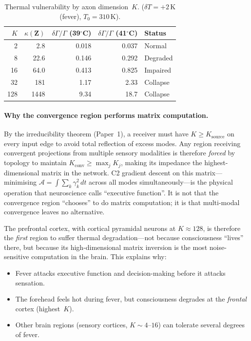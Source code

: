 \documentclass[aps,pre,twocolumn,superscriptaddress,floatfix]{revtex4-2}
\begin{document}
\begin{table}[h]
\centering
\caption{Thermal vulnerability by axon dimension~$K$.
($\delta T=+2$\,K (fever), $T_0=310$\,K).}
\label{tab:thermal-K}
\begin{tabular}{@{}rrrrl@{}}
\toprule
$K$ & $\kappa(\mathbf{Z})$ & $\delta\Gamma/\Gamma$ (39$^\circ$C)
    & $\delta\Gamma/\Gamma$ (41$^\circ$C) & Status \\
\midrule
2   & 2.8    & 0.018  & 0.037  & Normal \\
8   & 22.6   & 0.146  & 0.292  & Degraded \\
16  & 64.0   & 0.413  & 0.825  & Impaired \\
32  & 181    & 1.17   & 2.33   & Collapse \\
128 & 1448   & 9.34   & 18.7   & Collapse \\
\bottomrule
\end{tabular}
\end{table}

\paragraph{Why the convergence region performs matrix computation.}
By the irreducibility theorem (Paper~1),
a receiver must have $K \ge K_{\text{source}}$ on every
input edge to avoid total reflection of excess modes.
Any region receiving convergent projections from
multiple sensory modalities is therefore \emph{forced}
by topology to maintain
$K_{\text{conv}} \ge \max_j K_j$, making its
impedance the highest-dimensional matrix in the network.
C2 gradient descent on this matrix---minimising
$\mathcal{A} = \int\!\sum_k \gamma_k^2\,dt$ across
all modes simultaneously---is the physical operation that
neuroscience calls ``executive function''.
It is not that the convergence region ``chooses'' to do
matrix computation; it is that multi-modal convergence
leaves no alternative.

\noindent
The prefrontal cortex, with cortical pyramidal neurons at
$K\approx 128$, is therefore the \emph{first} region to
suffer thermal degradation---not because consciousness
``lives'' there, but because its high-dimensional matrix
inversion is the most noise-sensitive computation in the
brain.
This explains why:
\begin{itemize}
  \item Fever attacks executive function and decision-making
    before it attacks sensation.
  \item The forehead feels hot during fever, but consciousness
    degrades at the \emph{frontal} cortex (highest~$K$).
  \item Other brain regions (sensory cortices, $K\sim 4$--$16$)
    can tolerate several degrees of fever.
\end{itemize}
\end{document}
